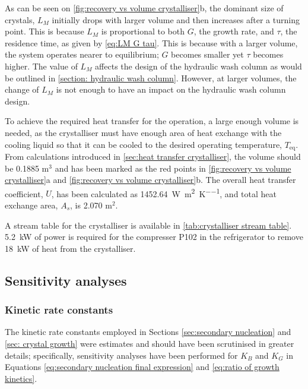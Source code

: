 As can be seen on \cref{fig:recovery vs volume crystalliser}b, the dominant size of crystals, $L_M$ initially drops with larger volume and then increases after a turning point. This is because $L_M$ is proportional to both $G$, the growth rate, and $\tau$, the residence time, as given by \cref{eq:LM G tau}. This is because with a larger volume, the system operates nearer to equilibrium; $G$ becomes smaller yet $\tau$ becomes higher. The value of $L_M$ affects the design of the hydraulic wash column as would be outlined in \cref{section: hydraulic wash column}. However, at larger volumes, the change of $L_M$ is not enough to have an impact on the hydraulic wash column design. 

To achieve the required heat transfer for the operation, a large enough volume is needed, as the crystalliser must have enough area of heat exchange with the cooling liquid so that it can be cooled to the desired operating temperature, $T_{\mathrm{eq}}$. From calculations introduced in \cref{sec:heat transfer crystalliser}, the volume should be 0.1885 m$^3$ and has been marked as the red points in \cref{fig:recovery vs volume crystalliser}a and \cref{fig:recovery vs volume crystalliser}b. The overall heat transfer coefficient, $U$, has been calculated as \SI{1452.64}{\W\per\square\m\per\K}, and total heat exchange area, $A_s$, is 2.070 m$^2$. 

A stream table for the crystalliser is available in \cref{tab:crystalliser stream table}. \SI{5.2}{\kW} of power is required for the compresser P102 in the refrigerator to remove \SI{18}{\kW} of heat from the crystalliser. 

\subsection{Sensitivity analyses}

\subsubsection{Kinetic rate constants}\label{sec:kinetics sensitivity}

The kinetic rate constants employed in Sections \ref{sec:secondary nucleation} and \ref{sec: crystal growth} were estimates and should have been scrutinised in greater details; specifically, sensitivity analyses have been performed for $K_B$ and $K_G$ in Equations \ref{eq:secondary nucleation final expression} and \ref{eq:ratio of growth kinetics}.

